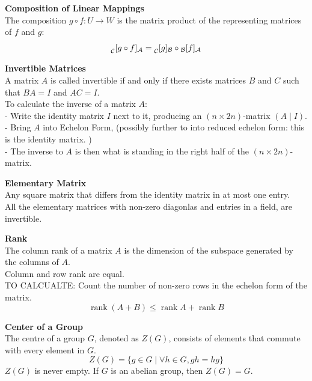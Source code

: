 \documentclass[a4paper, 10pt]{article}
\begin{document}
\begin{multicols*}{3}
\textbf{Composition of Linear Mappings}\\
The composition $g \circ f: U \rightarrow W$ is the matrix product of the representing matrices of $f$ and $g$:
$$
\prescript{}{\mathcal{C}}{[g \circ f]}_{\mathcal{A}}=\prescript{}{\mathcal{C}}{[g]}_{\mathcal{B}} \circ { }_{\mathcal{B}}[f]_{\mathcal{A}}
$$

\textbf{Invertible Matrices}\\
A matrix $A$ is called invertible if and only if there exists matrices $B$ and $C$ such that $BA=I$ and $AC=I$. \\
To calculate the inverse of a matrix $A$:\\
- Write the identity matrix $I$ next to it, producing an $(n \times 2 n)$-matrix $(A \mid I)$. \\
- Bring $A$ into Echelon Form, (possibly further to into reduced echelon form: this is the identity matrix. )\\
- The inverse to $A$ is then what is standing in the right half of the $(n \times 2 n)$-matrix.

\textbf{Elementary Matrix}\\
Any square matrix that differs from the identity matrix in at most one entry.\\
All the elementary matrices with non-zero diagonlas and entries in a field, are invertible.

\textbf{Rank}\\
The column rank of a matrix $A$ is the dimension of the subspace generated by the columns of $A$. \\
Column and row rank are equal. \\
TO CALCUALTE: Count the number of non-zero rows in the echelon form of the matrix. 
$$
\operatorname{rank}(A+B) \leq \operatorname{rank} A+\operatorname{rank} B
$$

\textbf{Center of a Group}\\
The centre of a group $G$, denoted as $Z(G)$, consists of elements that commute with every element in $G$.
$$Z(G)=\{g \in G \mid \forall h \in G, g h=h g\}$$
$Z(G)$ is never empty. 
If $G$ is an abelian group, then $Z(G)=G$.


\end{multicols*}
\end{document}
